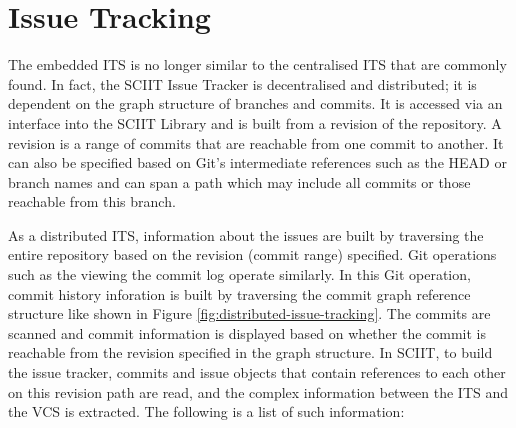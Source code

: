 \documentclass{mproj}
\begin{document}
\section{Issue Tracking}

The embedded ITS is no longer similar to the centralised ITS that are commonly found. In fact, the SCIIT Issue Tracker is decentralised and distributed; it is dependent on the graph structure of branches and commits. It is accessed via an interface into the SCIIT Library and is built from a revision of the repository. A revision is a range of commits that are reachable from one commit to another. It can also be specified based on Git’s intermediate references such as the HEAD or branch names and can span a path which may include all commits or those reachable from this branch.

As a distributed ITS, information about the issues are built by traversing the entire repository based on the revision (commit range) specified. Git operations such as the viewing the commit log operate similarly. In this Git operation, commit history inforation is built by traversing the commit graph reference structure like shown in Figure \ref{fig:distributed-issue-tracking}. The commits are scanned and commit information is displayed based on whether the commit is reachable from the revision specified in the graph structure. In SCIIT, to build the issue tracker, commits and issue objects that contain references to each other on this revision path are read, and the complex information between the ITS and the VCS is extracted. The following is a list of such information:
\end{document}
